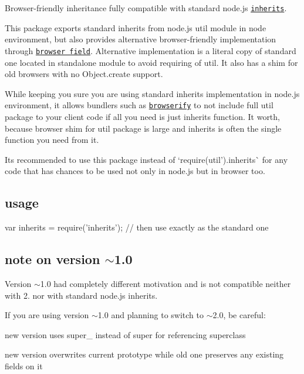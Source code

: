 Browser-\/friendly inheritance fully compatible with standard node.\+js \href{http://nodejs.org/api/util.html#util_util_inherits_constructor_superconstructor}{\tt inherits}.

This package exports standard {\ttfamily inherits} from node.\+js {\ttfamily util} module in node environment, but also provides alternative browser-\/friendly implementation through \href{https://gist.github.com/shtylman/4339901}{\tt browser field}. Alternative implementation is a literal copy of standard one located in standalone module to avoid requiring of {\ttfamily util}. It also has a shim for old browsers with no {\ttfamily Object.\+create} support.

While keeping you sure you are using standard {\ttfamily inherits} implementation in node.\+js environment, it allows bundlers such as \href{https://github.com/substack/node-browserify}{\tt browserify} to not include full {\ttfamily util} package to your client code if all you need is just {\ttfamily inherits} function. It worth, because browser shim for {\ttfamily util} package is large and {\ttfamily inherits} is often the single function you need from it.

It\textquotesingle{}s recommended to use this package instead of `require(\textquotesingle{}util').inherits\`{} for any code that has chances to be used not only in node.\+js but in browser too.

\subsection*{usage}


\begin{DoxyCode}
var inherits = require('inherits');
// then use exactly as the standard one
\end{DoxyCode}


\subsection*{note on version $\sim$1.0}

Version $\sim$1.0 had completely different motivation and is not compatible neither with 2. nor with standard node.\+js {\ttfamily inherits}.

If you are using version $\sim$1.0 and planning to switch to $\sim$2.0, be careful\+:


\begin{DoxyItemize}
\item new version uses {\ttfamily super\+\_\+} instead of {\ttfamily super} for referencing superclass
\item new version overwrites current prototype while old one preserves any existing fields on it 
\end{DoxyItemize}